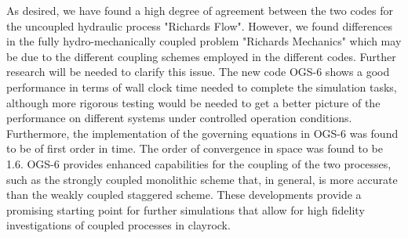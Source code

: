 As desired, we have found a high degree of agreement between the two codes for the uncoupled hydraulic process "Richards Flow". However, we found differences in the fully hydro-mechanically coupled problem "Richards Mechanics" which may be due to the different coupling schemes employed in the different codes. Further research will be needed to clarify this issue. The new code OGS-6 shows a good performance in terms of wall clock time needed to complete the simulation tasks, although more rigorous testing would be needed to get a better picture of the performance on different systems under controlled operation conditions. Furthermore, the implementation of the governing equations in OGS-6 was found to be of first order in time. The order of convergence in space was found to be 1.6. OGS-6 provides enhanced capabilities for the coupling of the two processes, such as the strongly coupled monolithic scheme that, in general, is more accurate than the weakly coupled staggered scheme. These developments provide a promising starting point for further simulations that allow for high fidelity investigations of coupled processes in clayrock.
